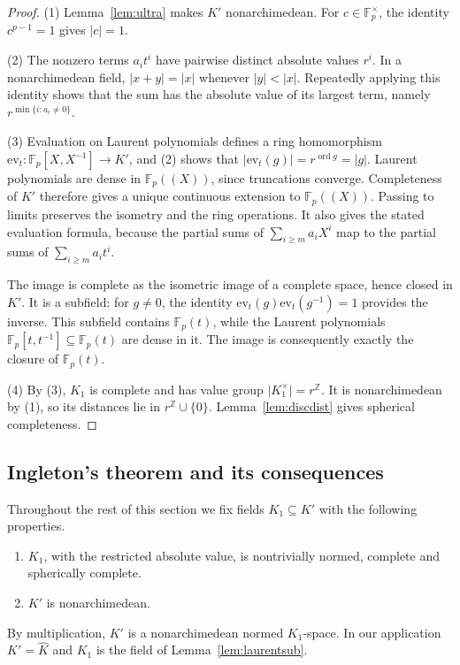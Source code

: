 \documentclass[11pt]{amsart}
\theoremstyle{definition}
\theoremstyle{remark}
\numberwithin{equation}{section}
\newcommand{\Z}{\mathbb Z}
\newcommand{\F}{\mathbb F}
\newcommand{\abs}[1]{\lvert #1\rvert}
\newcommand{\ord}{\operatorname{ord}}
\newcommand{\Kh}{\widehat K}
\theoremstyle{plain}
\theoremstyle{definition}
\theoremstyle{plain}
\begin{document}
\begin{proof}
(1) Lemma~\ref{lem:ultra} makes $K'$ nonarchimedean. For $c\in\F_p^\times$, the identity $c^{p-1}=1$ gives $\abs c=1$.

(2) The nonzero terms $a_it^i$ have pairwise distinct absolute values $r^i$. In a nonarchimedean field,
$\abs{x+y}=\abs x$ whenever $\abs y<\abs x$. Repeatedly applying this identity shows that the sum has the absolute
value of its largest term, namely $r^{\min\{i:a_i\ne0\}}$.

(3) Evaluation on Laurent polynomials defines a ring homomorphism
$\mathrm{ev}_t\colon\F_p[X,X^{-1}]\to K'$, and (2) shows that
$\abs{\mathrm{ev}_t(g)}=r^{\ord g}=\abs g$. Laurent polynomials are dense in $\F_p((X))$, since truncations converge.
Completeness of $K'$ therefore gives a unique continuous extension to $\F_p((X))$. Passing to limits preserves the
isometry and the ring operations. It also gives the stated evaluation formula, because the partial sums of
$\sum_{i\ge m}a_iX^i$ map to the partial sums of $\sum_{i\ge m}a_it^i$.

The image is complete as the isometric image of a complete space, hence closed in $K'$. It is a subfield: for
$g\ne0$, the identity $\mathrm{ev}_t(g)\mathrm{ev}_t(g^{-1})=1$ provides the inverse. This subfield contains
$\F_p(t)$, while the Laurent polynomials $\F_p[t,t^{-1}]\subseteq\F_p(t)$ are dense in it. The image is consequently
exactly the closure of $\F_p(t)$.

(4) By (3), $K_1$ is complete and has value group $\abs{K_1^\times}=r^\Z$. It is nonarchimedean by (1), so its distances
lie in $r^\Z\cup\{0\}$. Lemma~\ref{lem:discdist} gives spherical completeness.
\end{proof}

\subsection{Ingleton's theorem and its consequences}
Throughout the rest of this section we fix fields $K_1\subseteq K'$ with the following properties.
\begin{enumerate}
\item[(H1)] $K_1$, with the restricted absolute value, is nontrivially normed, complete and spherically complete.
\item[(H2)] $K'$ is nonarchimedean.
\end{enumerate}
By multiplication, $K'$ is a nonarchimedean normed $K_1$\nobreakdash-space. In our application $K'=\Kh$ and $K_1$ is the field of
Lemma~\ref{lem:laurentsub}.
\end{document}
